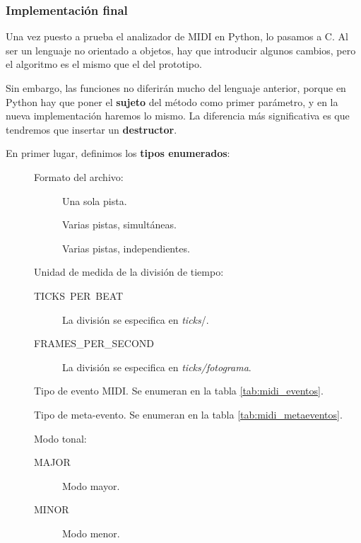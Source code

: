 \smallskip

\subsubsection{Implementación final}

Una vez puesto a prueba el analizador de \acrshort{MIDI} en Python, lo pasamos a C. Al ser un lenguaje no orientado a objetos, hay que introducir algunos cambios, pero el algoritmo es el mismo que el del prototipo. 

Sin embargo, las funciones no diferirán mucho del lenguaje anterior, porque en Python hay que poner el \textbf{sujeto} del método como primer parámetro, y en la nueva implementación haremos lo mismo. La diferencia más significativa es que tendremos que insertar un \textbf{destructor}.

En primer lugar, definimos los \textbf{tipos enumerados}:

\begin{description}
	\item[] Formato del archivo:
	
	\begin{description}
		\item[] Una sola pista.
		\item[] Varias pistas, simultáneas.
		\item[] Varias pistas, independientes.
	\end{description}
	
	\item[] Unidad de medida de la división de tiempo:
	
	\begin{description}
		\item[TICKS\ PER\ BEAT] La división se especifica en \textit{ticks}/\quarternote.
		\item[FRAMES\_PER\_SECOND] La división se especifica en \textit{ticks/fotograma}.
	\end{description}
	
	\item[] Tipo de evento \acrshort{MIDI}. Se enumeran en la tabla \ref{tab:midi_eventos}.
	\item[] Tipo de meta-evento. Se enumeran en la tabla \ref{tab:midi_metaeventos}.
	
	\item[] Modo tonal:
	
	\begin{description}
		\item[MAJOR] Modo mayor.
		\item[MINOR] Modo menor.
	\end{description}
\end{description}

